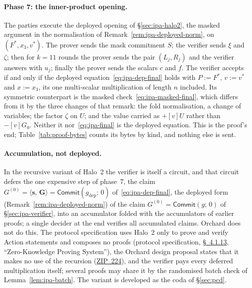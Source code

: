 \documentclass[11pt,a4paper]{article}
\theoremstyle{definition}
\newcommand{\ip}[2]{\langle #1,\, #2 \rangle}
\newcommand{\Comm}{\mathsf{Commit}}
\begin{document}
\paragraph{Phase 7: the inner-product opening.}
The parties execute the deployed opening of \S\ref{sec:ipa-halo2}, the
masked argument in the normalisation of
Remark~\ref{rem:ipa-deployed-norm}, on $(F^{*}, x_3, v^{*})$. The prover
sends the mask commitment $S$; the verifier sends $\xi$ and $\zeta$; then
for $k = 11$ rounds the prover sends the pair $(L_j, R_j)$ and the verifier
answers with $u_j$; finally the prover sends the scalars $c$ and $f$. The
verifier accepts if and only if the deployed
equation~\eqref{eq:ipa-dep-final} holds with $P := F^{*}$, $v := v^{*}$
and $x := x_3$, its one multi-scalar multiplication of length $n$
included. Its symmetric counterpart is the masked
check~\eqref{eq:ipa-masked-final}, which differs from it by the three
changes of that remark: the fold normalisation, a change of variables; the
factor $\zeta$ on $U$; and the value carried as $+[v]U$ rather than
$-[v]G_0$. Neither it nor~\eqref{eq:ipa-final} is the deployed equation.
This is the proof's end; Table~\ref{tab:proof-bytes} counts its bytes by
kind, and nothing else is sent.

\paragraph{Accumulation, not deployed.}
In the recursive variant of Halo~2 the verifier is itself a circuit, and
that circuit defers the one expensive step of phase~7, the claim
$G^{(0)} = \ip{\mathbf s}{\mathbf G} = \Comm(g_{\mathrm{dep}};\, 0)$
of~\eqref{eq:ipa-dep-final}, the deployed form
(Remark~\ref{rem:ipa-deployed-norm}) of the claim
$G^{(0)} = \Comm(g;\, 0)$ of \S\ref{sec:ipa-verifier}, into an
accumulator folded with the accumulators of earlier proofs; a single
decider at the end verifies all accumulated claims. Orchard does not do
this. The protocol specification uses Halo~2 only to prove and verify
Action statements and composes no proofs (protocol specification,
\href{https://zips.z.cash/protocol/protocol.pdf\#abstractzk}{\S~4.1.13},
``Zero-Knowledge Proving System''), the Orchard design proposal states that it
makes no use of the recursion (\href{https://zips.z.cash/zip-0224}{ZIP~224}),
and the verifier pays every deferred multiplication itself; several
proofs may share it by the randomised batch check of
Lemma~\ref{lem:ipa-batch}. The variant is developed as the coda of
\S\ref{sec:pcd}.
\end{document}
